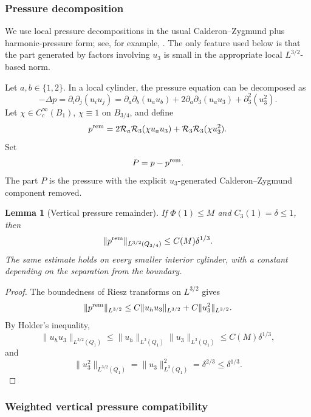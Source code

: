 \documentclass[11pt]{article}
\numberwithin{equation}{section}
\theoremstyle{plain}
\newtheorem{lemma}{Lemma}[section]
\theoremstyle{definition}
\theoremstyle{remark}
\newcommand{\calR}{\mathcal R}
\begin{document}
\subsubsection{Pressure decomposition}

We use local pressure decompositions in the usual Calderon--Zygmund plus harmonic-pressure form; see, for example, \cite{SohrWahl1986,SereginSverak2002,Seregin2015,Wolf2017}.  The only feature used below is that the part generated by factors involving \(u_3\) is small in the appropriate local \(L^{3/2}\)-based norm.

Let \(a,b\in\{1,2\}\).  In a local cylinder, the pressure equation can be decomposed as
\[
        -\Delta p
        =\partial_i\partial_j(u_iu_j)
        =\partial_a\partial_b(u_au_b)
        +2\partial_a\partial_3(u_au_3)
        +\partial_3^2(u_3^2).
\]
Let \(\chi\in C_c^\infty(B_1)\), \(\chi\equiv1\) on \(B_{3/4}\), and define
\begin{equation}\label{pI:eq:pressure-rem}
        p^{\rm rem}
        =2\calR_a\calR_3(\chi u_au_3)
        +\calR_3\calR_3(\chi u_3^2).
\end{equation}
Set
\begin{equation}\label{pI:eq:P-good}
        P=p-p^{\rm rem}.
\end{equation}
The part \(P\) is the pressure with the explicit \(u_3\)-generated Calderon--Zygmund component removed.

\begin{lemma}[Vertical pressure remainder]\label{pI:lem:prem}
If \(\Phi(1)\le M\) and \(C_3(1)=\delta\le1\), then
\[
        \|p^{\rm rem}\|_{L^{3/2}(Q_{3/4})}
        \le C(M)\delta^{1/3}.
\]
The same estimate holds on every smaller interior cylinder, with a constant depending on the separation from the boundary.
\end{lemma}

\begin{proof}
The boundedness of Riesz transforms on \(L^{3/2}\) gives
\[
        \|p^{\rm rem}\|_{L^{3/2}}
        \le C\|u_hu_3\|_{L^{3/2}}+C\|u_3^2\|_{L^{3/2}}.
\]
By Holder's inequality,
\[
        \|u_hu_3\|_{L^{3/2}(Q_1)}
        \le \|u_h\|_{L^3(Q_1)}\|u_3\|_{L^3(Q_1)}
        \le C(M)\delta^{1/3},
\]
and
\[
        \|u_3^2\|_{L^{3/2}(Q_1)}=\|u_3\|_{L^3(Q_1)}^2=\delta^{2/3}\le\delta^{1/3}.
\]
\end{proof}

\subsubsection{Weighted vertical pressure compatibility}
\end{document}
